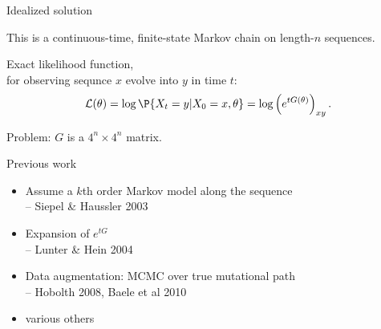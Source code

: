 \documentclass[smaller]{beamer}
\begin{document}
\begin{frame}{Idealized solution}

  This is a continuous-time, finite-state Markov chain on length-$n$ sequences.
  
  \vspace{1em}

  Exact likelihood function, \\
  \hspace{2em} for observing sequnce $x$ evolve into $y$ in time $t$:
  \begin{align*}
    \mathcal{L}(\theta) = \log \P\{ X_t = y | X_0 = x, \theta \} = \log \left( e^{tG(\theta)} \right)_{xy} .
  \end{align*}

  \vspace{1em}

  {\newthing Problem:} $G$ is a $4^n \times 4^n$ matrix.

\end{frame}


\begin{frame}{Previous work}

  \begin{itemize}

    \item Assume a $k$th order Markov model along the sequence \\
      -- Siepel \& Haussler 2003

    \item Expansion of $e^{tG}$ \\
      -- Lunter \& Hein 2004 

    \item Data augmentation: MCMC over true mutational path \\
      -- Hobolth 2008, Baele et al 2010

    \item various others

  \end{itemize}

\end{frame}
\end{document}
